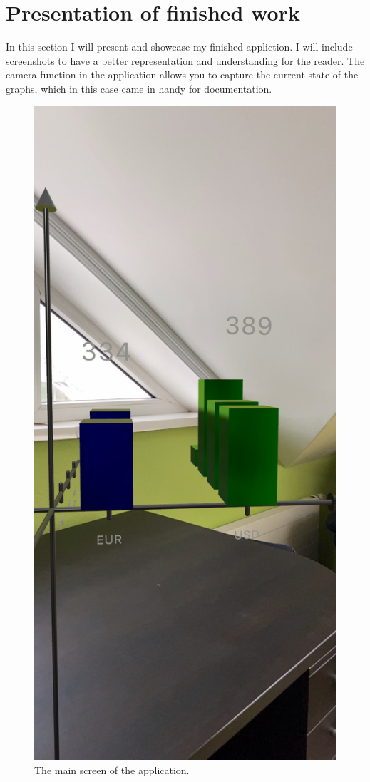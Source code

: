 \chapter{Presentation of finished work}

In this section I will present and showcase my finished appliction. I will include screenshots to have a better representation and understanding for the reader.
The camera function in the application allows you to capture the current state of the graphs, which in this case came in handy for documentation.


\begin{figure}[!ht]
    \centering
    \includegraphics[scale=0.2]{../images/front.jpeg}
    \caption{The main screen of the application.}
    \label{fig:TexnicCenter}
\end{figure}

